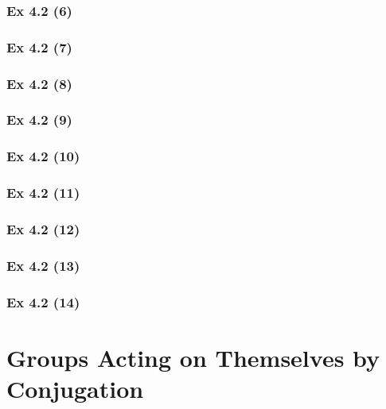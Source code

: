 \subsubsection{Ex 4.2 (6)}\label{sec:Ex_4.2.6}

\subsubsection{Ex 4.2 (7)}\label{sec:Ex_4.2.7}

\subsubsection{Ex 4.2 (8)}\label{sec:Ex_4.2.8}

\subsubsection{Ex 4.2 (9)}\label{sec:Ex_4.2.9}

\subsubsection{Ex 4.2 (10)}\label{sec:Ex_4.2.10}

\newpage		%

\subsubsection{Ex 4.2 (11)}\label{sec:Ex_4.2.11}

\subsubsection{Ex 4.2 (12)}\label{sec:Ex_4.2.12}

\subsubsection{Ex 4.2 (13)}\label{sec:Ex_4.2.13}

\subsubsection{Ex 4.2 (14)}\label{sec:Ex_4.2.14}

\newpage		%

\section{Groups Acting on Themselves by Conjugation}\label{sec:4.3}	
